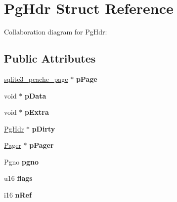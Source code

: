 \hypertarget{struct_pg_hdr}{\section{Pg\+Hdr Struct Reference}
\label{struct_pg_hdr}
}


Collaboration diagram for Pg\+Hdr\+:
\subsection*{Public Attributes}
\begin{DoxyCompactItemize}
\item 
\hypertarget{struct_pg_hdr_aa5645976ba0634993a7304dce8856c8b}{\hyperlink{structsqlite3__pcache__page}{sqlite3\+\_\+pcache\+\_\+page} $\ast$ {\bfseries p\+Page}}\label{struct_pg_hdr_aa5645976ba0634993a7304dce8856c8b}

\item 
\hypertarget{struct_pg_hdr_a0f9f2ac8492c0cdad5898036db20b798}{void $\ast$ {\bfseries p\+Data}}\label{struct_pg_hdr_a0f9f2ac8492c0cdad5898036db20b798}

\item 
\hypertarget{struct_pg_hdr_a8ff7430ed04077f1ae20d10801968164}{void $\ast$ {\bfseries p\+Extra}}\label{struct_pg_hdr_a8ff7430ed04077f1ae20d10801968164}

\item 
\hypertarget{struct_pg_hdr_a7732b1c0f19d9555ac93d4879fc95bbd}{\hyperlink{struct_pg_hdr}{Pg\+Hdr} $\ast$ {\bfseries p\+Dirty}}\label{struct_pg_hdr_a7732b1c0f19d9555ac93d4879fc95bbd}

\item 
\hypertarget{struct_pg_hdr_aaa4879a9510c8a819a1e10a8ee21495b}{\hyperlink{struct_pager}{Pager} $\ast$ {\bfseries p\+Pager}}\label{struct_pg_hdr_aaa4879a9510c8a819a1e10a8ee21495b}

\item 
\hypertarget{struct_pg_hdr_ab6e2223e410acf9bae7f12f1b1293589}{Pgno {\bfseries pgno}}\label{struct_pg_hdr_ab6e2223e410acf9bae7f12f1b1293589}

\item 
\hypertarget{struct_pg_hdr_a8ef58380f7e04f1e3c76fa208e227f95}{u16 {\bfseries flags}}\label{struct_pg_hdr_a8ef58380f7e04f1e3c76fa208e227f95}

\item 
\hypertarget{struct_pg_hdr_ac68c685d117788c18849e8853dd419d5}{i16 {\bfseries n\+Ref}}\label{struct_pg_hdr_ac68c685d117788c18849e8853dd419d5}


\end{DoxyCompactItemize}
